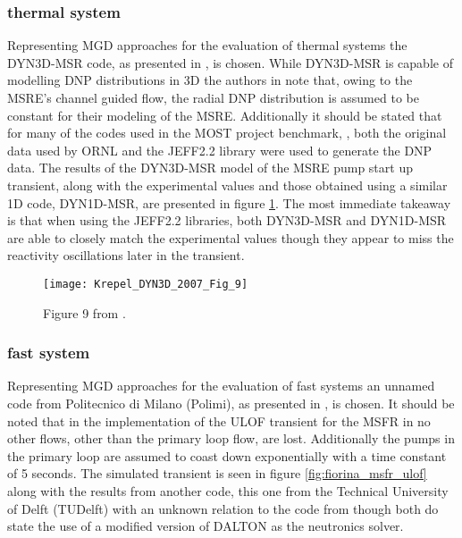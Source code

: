 \documentclass[review]{elsarticle}
\begin{document}
\subsubsection{thermal system} \label{sssec:mgd_ts}
Representing MGD approaches for the evaluation of thermal systems the DYN3D-MSR
code, as presented in \cite{krepel_dyn3d-msr_2007}, is chosen. While DYN3D-MSR is
capable of modelling DNP distributions in 3D the authors in
\cite{krepel_dyn3d-msr_2007} note that, owing to the MSRE's channel guided flow,
the radial DNP distribution is assumed to be constant for their modeling of the
MSRE. Additionally it should be stated that for many of the codes used in the
MOST project benchmark, \cite{delpech_benchmark_2003}, both the original data used
by ORNL and the JEFF2.2 library were used to generate the DNP data.
The results of the DYN3D-MSR model of the MSRE pump start up transient,
along with the experimental values and those obtained using a similar 1D code,
DYN1D-MSR, are presented in figure \ref{fig:krepel_dyn3d_msre_pump_start}. The most
immediate takeaway is that when using the JEFF2.2 libraries, both DYN3D-MSR and
DYN1D-MSR are able to closely match the experimental values though they appear to
miss the reactivity oscillations later in the transient.

\begin{figure}[h]
   \centering
   \texttt{[image: Krepel\_DYN3D\_2007\_Fig\_9]}
   \caption{Figure 9 from \cite{krepel_dyn3d-msr_2007}.} 
   \label{fig:krepel_dyn3d_msre_pump_start}
\end{figure}

\subsubsection{fast system} \label{sssec:mgd_fs}
Representing MGD approaches for the evaluation of fast systems an unnamed code
from Politecnico di Milano (Polimi), as presented in \cite{fiorina_modelling_2014}, is
chosen. It should be noted that in the implementation of the ULOF transient for
the MSFR in \cite{fiorina_modelling_2014} no other flows, other than the primary
loop flow, are lost. Additionally the pumps in the primary loop are assumed to
coast down exponentially with a time constant of 5 seconds. The simulated transient is
seen in figure \ref{fig:fiorina_msfr_ulof} along with the results from another
code, this one from the Technical University of Delft (TUDelft) with an unknown relation to
the code from \cite{kophazi_development_2009} though both do state the use of a
modified version of DALTON as the neutronics solver. 
\end{document}
